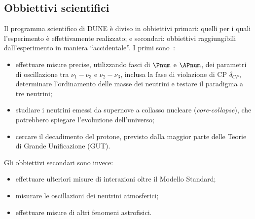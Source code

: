 \documentclass[../../main.tex]{subfiles}
\begin{document}
\subsection{Obbiettivi scientifici} \label{subsec:obbiettivi-scientifici}
  Il programma scientifico di DUNE è diviso in obbiettivi primari: quelli per
  i quali l'esperimento è effettivamente realizzato; e secondari: obbiettivi
  raggiungibili dall'esperimento in maniera ``accidentale''.
  I primi sono~\cite{dunecollaboration2022snowmassneutrinofrontierdune}:
  \begin{itemize}
    \item effettuare misure precise, utilizzando fasci di $\Pnum$ e $\APnum$,
    dei parametri di oscillazione tra $\nu_1 - \nu_3$ e $\nu_2 - \nu_3$, inclusa
    la fase di violazione di CP $\delta_{CP}$, determinare l'ordinamento delle
    masse dei neutrini e testare il paradigma a tre neutrini;

    \item studiare i neutrini emessi da supernove a collasso nucleare
    (\textit{core-collapse}), che potrebbero spiegare l'evoluzione
    dell'universo;

    \item cercare il decadimento del protone, previsto dalla
    maggior parte delle Teorie di Grande Unificazione (GUT).
  \end{itemize}
  Gli obbiettivi secondari sono invece:
  \begin{itemize}
    \item effettuare ulteriori misure di interazioni oltre il Modello Standard;

    \item misurare le oscillazioni dei neutrini atmosferici;

    \item effettuare misure di altri fenomeni astrofisici.
  \end{itemize}
\end{document}
